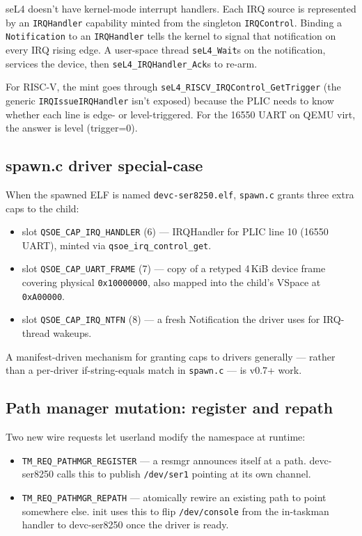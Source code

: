 seL4 doesn't have kernel-mode interrupt handlers.  Each IRQ source
is represented by an \texttt{IRQHandler} capability minted from
the singleton \texttt{IRQControl}.  Binding a \texttt{Notification}
to an \texttt{IRQHandler} tells the kernel to signal that
notification on every IRQ rising edge.  A user-space thread
\texttt{seL4\_Wait}s on the notification, services the device,
then \texttt{seL4\_IRQHandler\_Ack}s to re-arm.

For RISC-V, the mint goes through \texttt{seL4\_RISCV\_IRQControl\_GetTrigger}
(the generic \texttt{IRQIssueIRQHandler} isn't exposed) because the
PLIC needs to know whether each line is edge- or level-triggered.
For the 16550 UART on QEMU virt, the answer is level (trigger=0).

\subsection{spawn.c driver special-case}

When the spawned ELF is named \texttt{devc-ser8250.elf},
\texttt{spawn.c} grants three extra caps to the child:

\begin{itemize}
    \item slot \texttt{QSOE\_CAP\_IRQ\_HANDLER} (6) — IRQHandler for
          PLIC line 10 (16550 UART), minted via
          \texttt{qsoe\_irq\_control\_get}.
    \item slot \texttt{QSOE\_CAP\_UART\_FRAME} (7) — copy of a
          retyped 4\,KiB device frame covering physical
          \texttt{0x10000000}, also mapped into the child's VSpace
          at \texttt{0xA00000}.
    \item slot \texttt{QSOE\_CAP\_IRQ\_NTFN} (8) — a fresh
          Notification the driver uses for IRQ-thread wakeups.
\end{itemize}

A manifest-driven mechanism for granting caps to drivers
generally — rather than a per-driver if-string-equals match in
\texttt{spawn.c} — is v0.7+ work.

\subsection{Path manager mutation: register and repath}

Two new wire requests let userland modify the namespace at runtime:

\begin{itemize}
    \item \texttt{TM\_REQ\_PATHMGR\_REGISTER} — a resmgr announces
          itself at a path.  devc-ser8250 calls this to publish
          \texttt{/dev/ser1} pointing at its own channel.
    \item \texttt{TM\_REQ\_PATHMGR\_REPATH} — atomically rewire an
          existing path to point somewhere else.  init uses this to
          flip \texttt{/dev/console} from the in-taskman handler to
          devc-ser8250 once the driver is ready.
\end{itemize}

